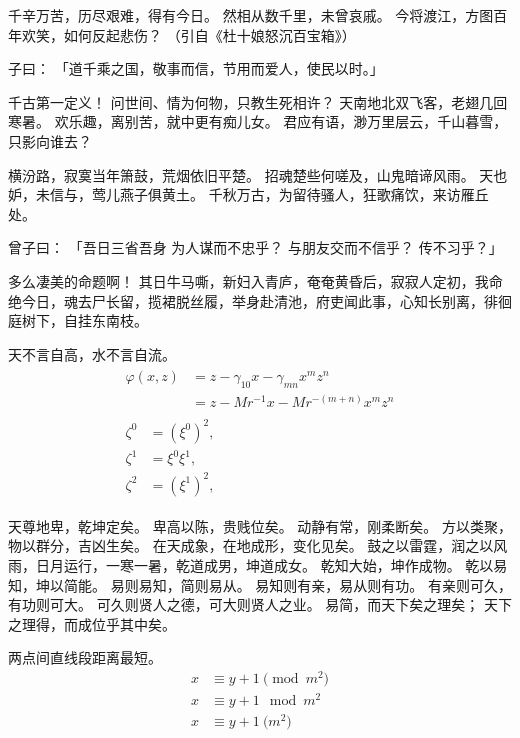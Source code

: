 \documentclass[../Main/thesis.tex]{subfiles}
\begin{document}
千辛万苦，历尽艰难，得有今日。
然相从数千里，未曾哀戚。
今将渡江，方图百年欢笑，如何反起悲伤？
（引自《杜十娘怒沉百宝箱》）

\begin{definition}
  子曰：
  「道千乘之国，敬事而信，节用而爱人，使民以时。」
\end{definition}

千古第一定义！
问世间、情为何物，只教生死相许？
天南地北双飞客，老翅几回寒暑。
欢乐趣，离别苦，就中更有痴儿女。
君应有语，渺万里层云，千山暮雪，只影向谁去？

横汾路，寂寞当年箫鼓，荒烟依旧平楚。
招魂楚些何嗟及，山鬼暗谛风雨。
天也妒，未信与，莺儿燕子俱黄土。
千秋万古，为留待骚人，狂歌痛饮，来访雁丘处。

\begin{proposition}
  曾子曰：
  「吾日三省吾身 \pozhehao 为人谋而不忠乎？
  与朋友交而不信乎？
  传不习乎？」
\end{proposition}

多么凄美的命题啊！
其日牛马嘶，新妇入青庐，奄奄黄昏后，寂寂人定初，我命绝今日，魂去尸长留，揽裙脱丝履，举身赴清池，府吏闻此事，心知长别离，徘徊庭树下，自挂东南枝。

\begin{remark}
  天不言自高，水不言自流。
  \begin{gather*}
    \begin{split}
      \varphi(x,z)
      &=z-\gamma_{10}x-\gamma_{mn}x^mz^n\\
      &=z-Mr^{-1}x-Mr^{-(m+n)}x^mz^n
    \end{split}\\[6pt]
    \begin{align} \zeta^0 & =(\xi^0)^2,  \\
      \zeta^1 & =\xi^0\xi^1, \\
      \zeta^2 & =(\xi^1)^2,
    \end{align}
  \end{gather*}
\end{remark}

天尊地卑，乾坤定矣。
卑高以陈，贵贱位矣。
动静有常，刚柔断矣。
方以类聚，物以群分，吉凶生矣。
在天成象，在地成形，变化见矣。
鼓之以雷霆，润之以风雨，日月运行，一寒一暑，乾道成男，坤道成女。
乾知大始，坤作成物。
乾以易知，坤以简能。
易则易知，简则易从。
易知则有亲，易从则有功。
有亲则可久，有功则可大。
可久则贤人之德，可大则贤人之业。
易简，而天下矣之理矣；
天下之理得，而成位乎其中矣。

\begin{axiom}
  两点间直线段距离最短。
  \begin{align}
    x & \equiv y+1\pmod{m^2} \\
    x & \equiv y+1\mod{m^2}  \\
    x & \equiv y+1\pod{m^2}
  \end{align}
\end{axiom}
\end{document}
